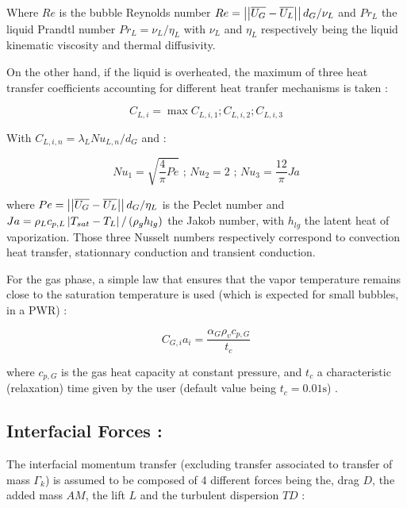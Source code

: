 Where $Re$ is the bubble Reynolds number $Re=\left|\left|{\overline{U_{G}}-\overline{U_{L}}}\right|\right|d_{G}/\nu_{L}$ and $Pr_{L}$ the liquid Prandtl number $Pr_{L}=\nu_{L}/\eta_{L}$ with $\nu_{L}$ and $\eta_{L}$ respectively being the liquid kinematic viscosity and thermal diffusivity.

On the other hand, if the liquid is overheated, the maximum of three heat transfer coefficients accounting for different heat tranfer mechanisms is taken \cite{Berne1983}:

\begin{equation}
\label{eq:superheated_HT}
C_{L,i}=\max{C_{L,i,1} ; C_{L,i,2} ; C_{L,i,3}}
\end{equation}

With $C_{L,i,n}=\lambda_{L}Nu_{L,n}/d_{G}$ and :

\begin{equation}
\label{eq:nusselt}
Nu_{1}=\sqrt{\frac{4}{\pi}Pe}\text { ; } Nu_{2}=2 \text{ ; } Nu_{3}=\frac{12}{\pi} Ja
\end{equation}


where $Pe=\left|\left|{ \overline{U_{G}}-\overline{U_{L}} }\right|\right|d_{G}/\eta_{L}$ is the Peclet number and $Ja=\rho_{L}c_{p,L}\left| T_{sat}-T_{L} \right|/\left( \rho_{g} h_{lg} \right)$ the Jakob number, with $h_{lg}$ the latent heat of vaporization. Those three Nusselt numbers respectively correspond to convection heat transfer, stationnary conduction and transient conduction.


For the gas phase, a simple law that ensures that the vapor temperature remains close to the saturation temperature is used (which is expected for small bubbles, \eg in a PWR) :

\begin{equation}
\label{eq:gas_relaxation}
C_{G,i}a_{i}=\frac{\alpha_{G}\rho_{v}c_{p,G}}{t_{c}}
\end{equation}

where $c_{p,G}$ is the gas heat capacity at constant pressure, and $t_{c}$ a characteristic (relaxation) time given by the user (default value being $t_{c}=0.01\text{s}$) .

\subsection{Interfacial Forces :}

The interfacial momentum transfer (excluding transfer associated to transfer of mass $\Gamma_{k}$) is assumed to be composed of 4 different forces being the, drag $D$, the added mass $AM$, the lift $L$ and the turbulent dispersion $TD$ :

